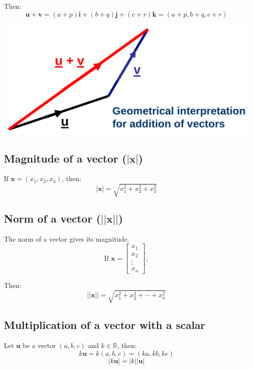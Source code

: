 \documentclass[11pt]{article}
\begin{document}
Then:
\[\boldsymbol{u} + \boldsymbol{v} = (a + p) \boldsymbol{i} + (b + q) \boldsymbol{j} + (c + r) \boldsymbol{k} = (a + p, b + q, c + r)\]

\begin{center}
\includegraphics[width=.9\linewidth]{./images/addition-of-vectors-geometrical-interpretation.png}
\end{center}

\subsection{Magnitude of a vector (\(| \boldsymbol{x} |\))}
\label{sec:orgbe70de5}
If \(\boldsymbol{x} = (x_1, x_2, x_3)\), then:
\[| \boldsymbol{x} | = \sqrt{x_1^2 + x_2^2 + x_3^2}\]

\subsection{Norm of a vector (\(|| \boldsymbol{x} ||\))}
\label{sec:org49f28dd}
The norm of a vector gives its magnitude.
\begin{displaymath}
\text{If } \boldsymbol{x} = \begin{bmatrix}
x_1 \\
x_2 \\
\vdots \\
x_n
\end{bmatrix},
\end{displaymath}

Then:
\[|| \boldsymbol{x} || = \sqrt{x_1^2 + x_2^2 + \cdots + x_n^2}\]

\subsection{Multiplication of a vector with a scalar}
\label{sec:org8361a89}
Let \(\boldsymbol{u}\) be a vector \((a, b, c)\) and \(k \in \mathbb{R}\), then:
\[k \boldsymbol{u} = k (a, b, c) = (ka, kb, kc)\]
\[|k \boldsymbol{u}| = |k| |\boldsymbol{u}|\]
\end{document}
